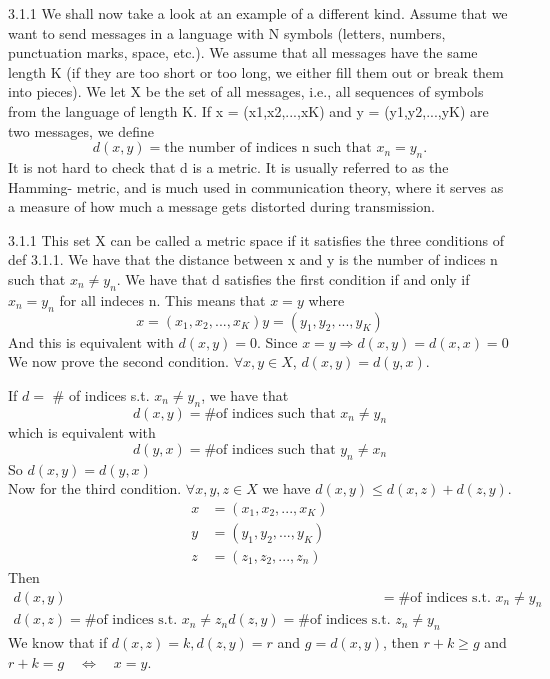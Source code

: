 \documentclass[a4paper,norsk]{article}
\renewcommand{\geq}{\geqslant}
\renewcommand{\leq}{\leqslant}
\begin{document}
\begin{oppgavebox}{3.1.1}{}
We shall now take a look at an example of a different kind. Assume that we want to send messages in a language with N symbols (letters, numbers, punctuation marks, space, etc.). We assume that all messages have the same length K (if they are too short or too long, we either fill them out or break them into pieces). We let X be the set of all messages, i.e., all sequences of symbols from the language of length K. If x = (x1,x2,...,xK) and y = (y1,y2,...,yK) are two messages, we define
$$d(x, y) = \text{the number of indices n such that } x_n = y_n. $$
It is not hard to check that d is a metric. It is usually referred to as the Hamming- metric, and is much used in communication theory, where it serves as a measure of how much a message gets distorted during transmission.

\begin{proofbox}{3.1.1}{}
    This set X can be called a metric space if it satisfies the three conditions of def 3.1.1. We have that the distance between x and y is the number of indices n such that $ x_n \neq y_n $. We have that d satisfies the first condition if and only if $ x_n = y_n $ for all indeces n. This means that $ x = y $ where
    \[
        x = \left( x_1, x_2, ..., x_K \right) 
        y = \left( y_1, y_2, ..., y_K \right) 
    \]
    And this is equivalent with $ d(x,y) = 0 $. Since $ x=y \Rightarrow d(x,y) = d(x,x) = 0 $ \\

    We now prove the second condition. $ \forall x, y \in X $, $ d(x, y) = d(y, x) $.
    
    If $ d =  $ \# of indices s.t. $ x_n \neq y_n $, we have that 
    \[
        d(x, y) = \text{\# of indices such that } x_n \neq y_n
    \]
    which is equivalent with 
    \[
        d(y, x) = \text{\# of indices such that } y_n \neq x_n
    \]
    So $ d(x, y) = d(y, x) $\\

    Now for the third condition. $ \forall x, y, z \in X $ we have $ d(x, y) \leq d(x, z) + d(z, y) $.
    \begin{align*}
      x &= \left( x_1, x_2, ..., x_K \right) \\
      y &= \left( y_1, y_2, ..., y_K \right) \\
      z &= \left( z_1, z_2, ..., z_n \right) 
    \end{align*}
    Then 
    \begin{align*}
      d(x, y) &= \text{\# of indices s.t. } x_n \neq y_n\\
      d(x, z) = \text{\# of indices s.t. } x_n \neq z_n
      d(z, y) = \text{\# of indices s.t. } z_n \neq y_n
    \end{align*}
    We know that if $ d(x, z) = k, d(z, y) = r $ and $ g = d(x, y) $, then $ r + k \geq g $ and $ r+k=g \quad \iff \quad x=y $. 
    
\end{proofbox}
\end{oppgavebox}
\end{document}
